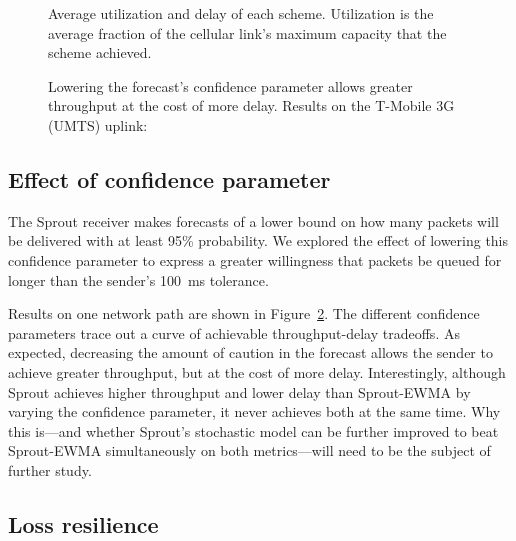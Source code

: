 \begin{figure}
\caption{Average utilization and delay of each scheme. Utilization is
  the average fraction of the cellular link's maximum capacity that
  the scheme achieved.}

\vspace{\baselineskip}

\def\svgwidth{\columnwidth}

\label{f:codelchart}

\end{figure}

\begin{figure}
\caption{Lowering the forecast's confidence parameter allows greater
  throughput at the cost of more delay. Results on the T-Mobile 3G (UMTS)
  uplink:}

\vspace{\baselineskip}

\def\svgwidth{\columnwidth}

\label{f:varysprout}

\end{figure}

\subsection{Effect of confidence parameter}

The Sprout receiver makes forecasts of a lower bound on how many
packets will be delivered with at least 95\% probability. We explored
the effect of lowering this confidence parameter to express a greater
willingness that packets be queued for longer than the sender's 100~ms
tolerance.

Results on one network path are shown in
Figure~\ref{f:varysprout}. The different confidence parameters trace
out a curve of achievable throughput-delay tradeoffs. As expected,
decreasing the amount of caution in the forecast allows the sender to
achieve greater throughput, but at the cost of more delay.
Interestingly, although Sprout achieves higher throughput and lower
delay than Sprout-EWMA by varying the confidence parameter, it never
achieves both at the same time. Why this is---and whether Sprout's
stochastic model can be further improved to beat Sprout-EWMA
simultaneously on both metrics---will need to be the subject of
further study.

\subsection{Loss resilience}
\label{ss:loss}

